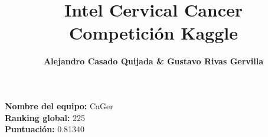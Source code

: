 \documentclass[10pt,a4paper]{article}
\author{\textbf{Alejandro Casado Quijada \& Gustavo Rivas Gervilla}}
\title{\textcolor{deepblue}{\textbf{Intel Cervical Cancer \\Competición Kaggle}}}
\date{}
\begin{document}
\maketitle

\begin{center}
  \textbf{Nombre del equipo: }CaGer\\
  \textbf{Ranking global: }225\\
  \textbf{Puntuación: }0.81340
\end{center}

\newpage

\tableofcontents

\newpage

















\end{document}
